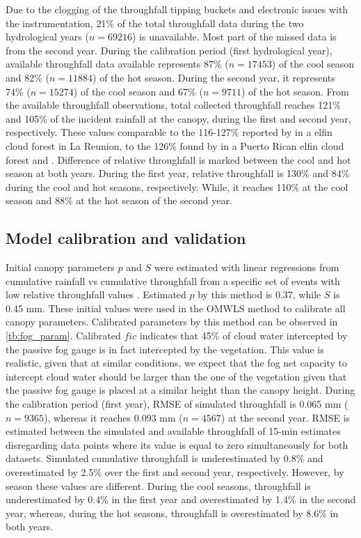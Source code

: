\documentclass[a4paper,12pt]{article}
\begin{document}
\begin{linenumbers}
Due to the clogging of the throughfall tipping buckets and electronic issues with the instrumentation, 21\% of the total throughfall data during the two hydrological years ($n=69216$) is unavailable. Most part of the missed data is from the second year. During the calibration period (first hydrological year), available throughfall data available represents 87\% ($n=17453$) of the cool season and 82\% ($n=11884$) of the hot season. During the second year, it represents 74\% ($n=15274$) of the cool season and 67\% ($n=9711$) of the hot season. From the available throughfall observations, total collected throughfall reaches 121\% and 105\% of the incident rainfall at the canopy, during the first and second year, respectively. These values comparable to the 116-127\% reported by \cite{Gabrieletal2008} in a elfin cloud forest in La Reunion, to the 126\% found by  \citep{Holwerdaetal2006} in a Puerto Rican elfin cloud forest and . Difference of relative throughfall is marked between the cool and hot season at both years. During the first year, relative throughfall is 130\% and 84\% during the cool and hot seasons, respectively. While, it reaches 110\% at the cool season and 88\% at the hot season of the second year. 

\subsection{Model calibration and validation}
Initial canopy parameters $p$ and $S$ were estimated with linear regressions from cumulative rainfall vs cumulative throughfall from a specific set of events with low relative throughfall values \citep{Pryetetal2012a}. Estimated $p$ by this method is 0.37, while $S$ is 0.45 mm. These initial values were used in the OMWLS method to calibrate all canopy parameters. Calibrated parameters by this method can be observed in \autoref{tb:fog_param}. Calibrated $fic$ indicates that 45\% of cloud water intercepted by the passive fog gauge is in fact intercepted by the vegetation. This value is realistic, given that at similar conditions, we expect that the fog net capacity to intercept cloud water should be larger than the one of the vegetation given that the passive fog gauge is placed at a similar height than the canopy height. During the calibration period (first year), RMSE of simulated throughfall is 0.065 mm ($n=9365$), whereas it reaches 0.093 mm ($n=4567$) at the second year. RMSE is estimated between the simulated and available throughfall of 15-min estimates disregarding data points where its value is equal to zero simultaneously for both datasets. Simulated cumulative throughfall is underestimated by 0.8\% and overestimated by 2.5\% over the first and second year, respectively. However, by season these values are different. During the cool seasons, throughfall is underestimated by 0.4\% in the first year and overestimated by 1.4\% in the second year, whereas, during the hot seasons, throughfall is overestimated by 8.6\% in both years.


\end{linenumbers}
\end{document}
